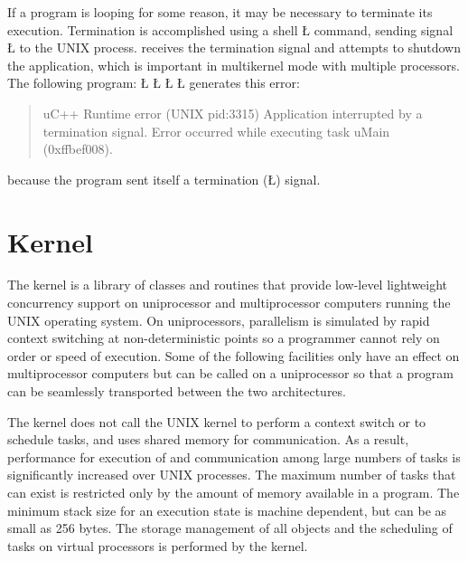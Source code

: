 \documentclass[openright,twoside]{report}
\begin{document}
If a \uC program is looping for some reason, it may be necessary to terminate its execution.
Termination is accomplished using a shell \LGinlinetrue\LGbegin\lgrinde\L{}\endlgrinde\LGend{} command, sending signal \LGinlinetrue\LGbegin\lgrinde\L{}\endlgrinde\LGend{} to the UNIX process.
\uC receives the termination signal and attempts to shutdown the application, which is important in multikernel mode with multiple processors.
The following program:
\LGinlinefalse\LGbegin\lgrinde
\L{}
\CE{}\L{}
\L{\LB{}}
\CE{}\L{\LB{\}}}
\endlgrinde\LGend
generates this error:
\begin{quote}
\BGfont
uC++ Runtime error (UNIX pid:3315) Application interrupted by a termination signal.
Error occurred while executing task uMain (0xffbef008).
\end{quote}
because the \uC program sent itself a termination (\LGinlinetrue\LGbegin\lgrinde\L{}\endlgrinde\LGend{}) signal.


\chapter{\texorpdfstring{\uC Kernel}{uC++ Kernel}}
\label{c:uC++kernel}

The \uC kernel is a library of classes and routines that provide low-level lightweight concurrency support on uniprocessor and multiprocessor computers running the UNIX operating system.
On uniprocessors, parallelism is simulated by rapid context switching at non-deterministic points so a programmer cannot rely on order or speed of execution.
Some of the following facilities only have an effect on multiprocessor computers but can be called on a uniprocessor so that a program can be seamlessly transported between the two architectures.

The \uC kernel does not call the UNIX kernel to perform a context switch or to schedule tasks, and uses shared memory for communication.
As a result, performance for execution of and communication among large numbers of tasks is significantly increased over UNIX processes.
The maximum number of tasks that can exist is restricted only by the amount of memory available in a program.
The minimum stack size for an execution state is machine dependent, but can be as small as 256 bytes.
The storage management of all \uC objects and the scheduling of tasks on virtual processors is performed by the \uC kernel.
\end{document}
